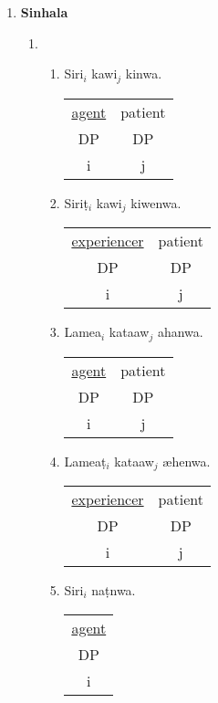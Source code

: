 \documentclass[12pt]{article}
\begin{document}
\begin{enumerate}[label=\textbf{\arabic*.}]
\pagebreak
\item \textbf{Sinhala}
\begin{enumerate}[label=(\arabic*)]
\item
\begin{enumerate}[label=\alph*.]
\item Siri$_{i}$ kawi$_{j}$ kinwa.\\
\begin{tabular}{ |c|c| } 
 \hline
 \underline{agent} & patient \\ 
 DP & DP \\ 
 \hline
 i & j \\ 
 \hline
\end{tabular}

\item Siri\d{t}$_{i}$ kawi$_{j}$ kiwenwa.\\
\begin{tabular}{ |c|c| } 
 \hline
 \underline{experiencer} & patient \\ 
 DP & DP \\ 
 \hline
 i & j \\ 
 \hline
\end{tabular}


\item Lamea$_{i}$ kataaw$_{j}$ ahanwa.\\
\begin{tabular}{ |c|c| } 
 \hline
 \underline{agent} & patient \\ 
 DP & DP \\ 
 \hline
 i & j \\ 
 \hline
\end{tabular}

\item Lamea\d{t}$_{i}$ kataaw$_{j}$ \ae henwa.\\
\begin{tabular}{ |c|c| } 
 \hline
 \underline{experiencer} & patient \\ 
 DP & DP \\ 
 \hline
 i & j \\ 
 \hline
\end{tabular}

\item Siri$_{i}$  na\d{t}nwa.\\
\begin{tabular}{ |c| } 
 \hline
 \underline{agent} \\ 
 DP \\ 
 \hline
 i \\ 
 \hline
\end{tabular}


\end{enumerate}
\end{enumerate}
\end{enumerate}
\end{document}
